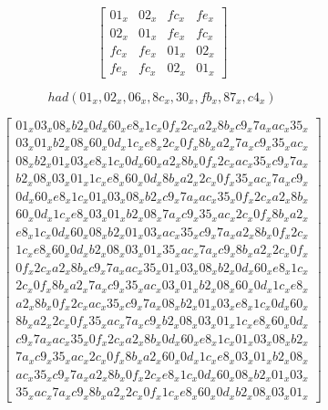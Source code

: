 \begin{equation}\label{mat:gupta_ray_2}
\begin{bmatrix}
01_x & 02_x & fc_x & fe_x\\
02_x & 01_x & fe_x & fc_x\\
fc_x & fe_x & 01_x & 02_x\\
fe_x & fc_x & 02_x & 01_x
\end{bmatrix}
\end{equation}

\begin{equation}\label{mat:gupta_ray_3}
had(01_x, 02_x, 06_x, 8c_x, 30_x, fb_x, 87_x, c4_x)
\end{equation}

\begin{tiny}
\begin{equation}\label{mat:gupta_ray_4}
\begin{bmatrix}
01_x 03_x 08_x b2_x 0d_x 60_x e8_x 1c_x 0f_x 2c_x a2_x 8b_x c9_x 7a_x ac_x 35_x\\
03_x 01_x b2_x 08_x 60_x 0d_x 1c_x e8_x 2c_x 0f_x 8b_x a2_x 7a_x c9_x 35_x ac_x\\
08_x b2_x 01_x 03_x e8_x 1c_x 0d_x 60_x a2_x 8b_x 0f_x 2c_x ac_x 35_x c9_x 7a_x\\
b2_x 08_x 03_x 01_x 1c_x e8_x 60_x 0d_x 8b_x a2_x 2c_x 0f_x 35_x ac_x 7a_x c9_x\\
0d_x 60_x e8_x 1c_x 01_x 03_x 08_x b2_x c9_x 7a_x ac_x 35_x 0f_x 2c_x a2_x 8b_x\\
60_x 0d_x 1c_x e8_x 03_x 01_x b2_x 08_x 7a_x c9_x 35_x ac_x 2c_x 0f_x 8b_x a2_x\\
e8_x 1c_x 0d_x 60_x 08_x b2_x 01_x 03_x ac_x 35_x c9_x 7a_x a2_x 8b_x 0f_x 2c_x\\
1c_x e8_x 60_x 0d_x b2_x 08_x 03_x 01_x 35_x ac_x 7a_x c9_x 8b_x a2_x 2c_x 0f_x\\
0f_x 2c_x a2_x 8b_x c9_x 7a_x ac_x 35_x 01_x 03_x 08_x b2_x 0d_x 60_x e8_x 1c_x\\
2c_x 0f_x 8b_x a2_x 7a_x c9_x 35_x ac_x 03_x 01_x b2_x 08_x 60_x 0d_x 1c_x e8_x\\
a2_x 8b_x 0f_x 2c_x ac_x 35_x c9_x 7a_x 08_x b2_x 01_x 03_x e8_x 1c_x 0d_x 60_x\\
8b_x a2_x 2c_x 0f_x 35_x ac_x 7a_x c9_x b2_x 08_x 03_x 01_x 1c_x e8_x 60_x 0d_x\\
c9_x 7a_x ac_x 35_x 0f_x 2c_x a2_x 8b_x 0d_x 60_x e8_x 1c_x 01_x 03_x 08_x b2_x\\
7a_x c9_x 35_x ac_x 2c_x 0f_x 8b_x a2_x 60_x 0d_x 1c_x e8_x 03_x 01_x b2_x 08_x\\
ac_x 35_x c9_x 7a_x a2_x 8b_x 0f_x 2c_x e8_x 1c_x 0d_x 60_x 08_x b2_x 01_x 03_x\\
35_x ac_x 7a_x c9_x 8b_x a2_x 2c_x 0f_x 1c_x e8_x 60_x 0d_x b2_x 08_x 03_x 01_x
\end{bmatrix}
\end{equation}
\end{tiny}


